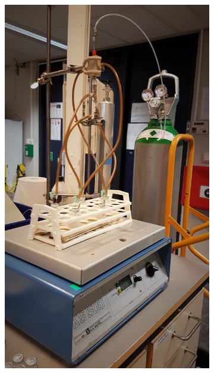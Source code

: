 \begin{figure}[p]
    \centering
    \begin{subfigure}{0.45\textwidth}
        \includegraphics[width=\linewidth]{img/fig/shaker.jpg}
        \caption{} \label{fig:shaker}
    \end{subfigure}
    \hspace*{.05\textwidth} %
    \begin{subfigure}{0.45\textwidth}

\end{subfigure}
\end{figure}
